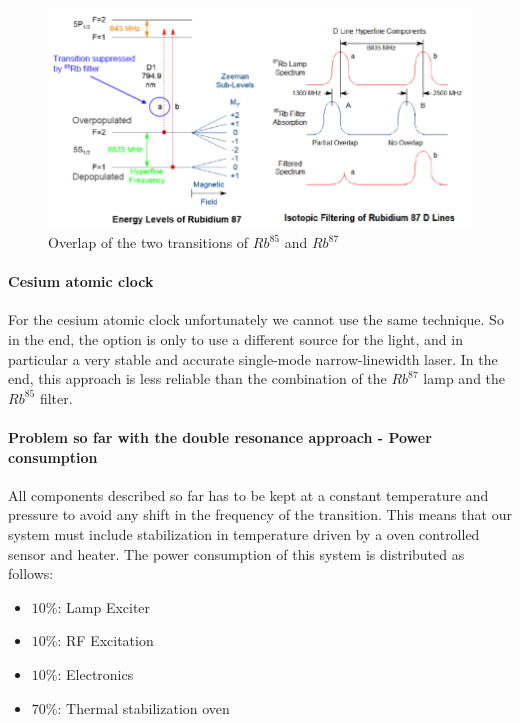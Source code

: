 \begin{figure}[H]
    \centering
    \includegraphics[width=\linewidth]{img/02.2-overlap-for-filtering-rubidium.png}
    \caption{Overlap of the two transitions of $Rb^{85}$ and $Rb^{87}$}
    \label{fig:overlap-for-filtering-rubidium}
\end{figure}

\paragraph{Cesium atomic clock}

For the cesium atomic clock unfortunately we cannot use the same technique.
So in the end, the option is only to use a different source for the light, and in particular a very stable and accurate single-mode narrow-linewidth laser.
In the end, this approach is less reliable than the combination of the $Rb^{87}$ lamp and the $Rb^{85}$ filter.

\paragraph{Problem so far with the double resonance approach - Power consumption}

All components described so far has to be kept at a constant temperature and pressure to avoid any shift in the frequency of the transition.
This means that our system must include stabilization in temperature driven by a oven controlled sensor and heater.
The power consumption of this system is distributed as follows:

\begin{itemize}
    \item $10\%$: Lamp Exciter
    \item $10\%$: RF Excitation
    \item $10\%$: Electronics
    \item $70\%$: Thermal stabilization oven
\end{itemize}

